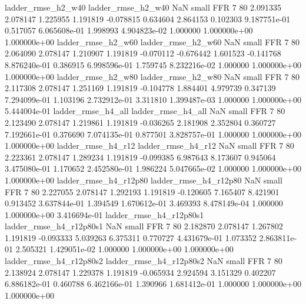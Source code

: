       ladder_rmse_h2_w40       ladder_rmse_h2_w40                   NaN      small      FFR                 7 80 2.091335       2.078147 1.225955       1.191819   -0.078815      0.634604      2.864153     0.102303   9.187751e-01  0.517057 6.065608e-01     1.998993   4.904823e-02            1.000000    1.000000e+00        1.000000e+00
      ladder_rmse_h2_w60       ladder_rmse_h2_w60                   NaN      small      FFR                 7 80 2.064090       2.078147 1.210907       1.191819   -0.070112     -0.676442      1.601523    -0.141768   8.876240e-01  0.386915 6.998596e-01     1.759745   8.232216e-02            1.000000    1.000000e+00        1.000000e+00
      ladder_rmse_h2_w80       ladder_rmse_h2_w80                   NaN      small      FFR                 7 80 2.117308       2.078147 1.251169       1.191819   -0.104778      1.884401      4.979739     0.347139   7.294099e-01  1.103196 2.732912e-01     3.311810   1.399487e-03            1.000000    1.000000e+00        5.444004e-01
      ladder_rmse_h4_all       ladder_rmse_h4_all                   NaN      small      FFR                 7 80 2.123490       2.078147 1.219861       1.191819   -0.036265      2.181908      2.352804     0.360727   7.192661e-01  0.376690 7.074135e-01     0.877501   3.828757e-01            1.000000    1.000000e+00        1.000000e+00
      ladder_rmse_h4_r12       ladder_rmse_h4_r12                   NaN      small      FFR                 7 80 2.223361       2.078147 1.289234       1.191819   -0.099385      6.987643      8.173607     0.945064   3.475080e-01  1.170652 2.452580e-01     1.986224   5.047665e-02            1.000000    1.000000e+00        1.000000e+00
   ladder_rmse_h4_r12p80    ladder_rmse_h4_r12p80                   NaN      small      FFR                 7 80 2.227055       2.078147 1.292193       1.191819   -0.120605      7.165407      8.421901     0.913452   3.637844e-01  1.394549 1.670612e-01     3.469393   8.478149e-04            1.000000    1.000000e+00        3.416694e-01
 ladder_rmse_h4_r12p80s1  ladder_rmse_h4_r12p80s1                   NaN      small      FFR                 7 80 2.182870       2.078147 1.267802       1.191819   -0.093333      5.039263      6.375311     0.770727   4.431679e-01  1.073352 2.863811e-01     2.505321   1.429051e-02            1.000000    1.000000e+00        1.000000e+00
 ladder_rmse_h4_r12p80s2  ladder_rmse_h4_r12p80s2                   NaN      small      FFR                 7 80 2.138924       2.078147 1.229378       1.191819   -0.065934      2.924594      3.151329     0.402207   6.886182e-01  0.460788 6.462166e-01     1.390966   1.681412e-01            1.000000    1.000000e+00        1.000000e+00
